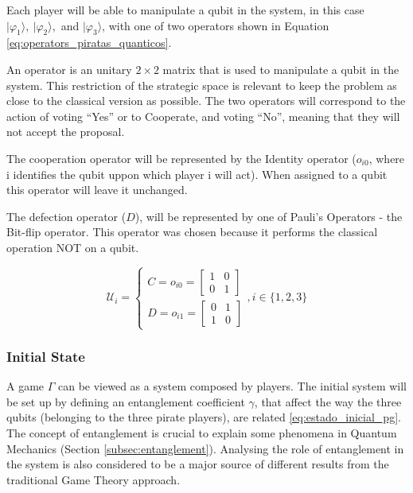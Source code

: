 Each player will be able to manipulate a qubit in the system, in this case $\vert\varphi_{1}\rangle,\:\vert\varphi_{2}\rangle,$ and $\vert\varphi_{3}\rangle$, with one of two operators shown in Equation \ref{eq:operators_piratas_quanticos}. 

An operator is an unitary $2\times2$ matrix that is used to manipulate a qubit in the system.
This restriction of the strategic space is relevant to keep the problem as close to the classical version as possible. The two operators will correspond to the action of voting ``Yes'' or to Cooperate, and voting ``No'', meaning that they will not accept the proposal.  

The cooperation operator will be represented by the Identity operator ($o_{i0}$, where i identifies the qubit uppon which player i will act). When assigned to a qubit this operator will leave it unchanged. 

The defection operator ($D$), will be represented by one of Pauli's Operators - the Bit-flip operator. This operator was chosen because it performs the classical operation NOT on a qubit.

\begin{equation}
\label{eq:operators_piratas_quanticos}
\mathcal{U}_{i} = \begin{cases}
C = o_{i0}=\left[\begin{array}{cc}
1 & 0\\
0 & 1
\end{array}\right]\\
D = o_{i1}=\left[\begin{array}{cc}
0 & 1\\
1 & 0
\end{array}\right]
\end{cases} , i \in \{ 1, 2, 3 \}
\end{equation}


\subsubsection{Initial State}
\label{subsec:pirates_initialstate}

A game $\Gamma$ can be viewed as a system composed by players. The initial system will be set up by defining an entanglement coefficient $\gamma$, that affect the way the three qubits (belonging to the three pirate players), are related \ref{eq:estado_inicial_pg}. The concept of entanglement is crucial to explain some phenomena in Quantum Mechanics (Section \ref{subsec:entanglement}). Analysing the role of entanglement in the system is also considered to be a major source of different results from the traditional Game Theory approach\cite{Fra2011a}\cite{Fra2011}\cite{Letters2002}\cite{Khan2011}\cite{Ricketts2006}. 
 
